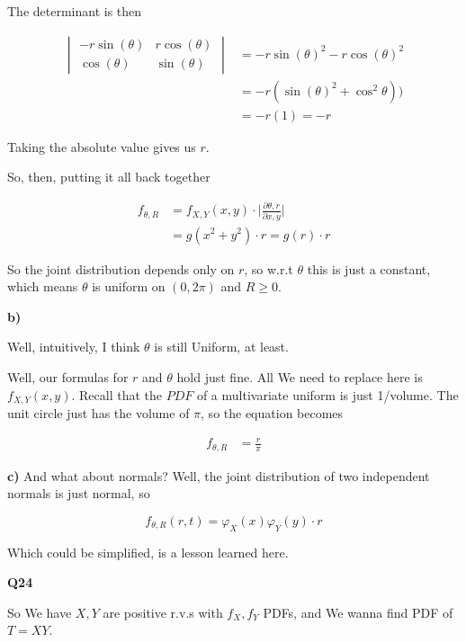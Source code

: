 \documentclass{article}
\begin{document}
			The determinant is then
			
			\begin{align*}
			\begin{vmatrix}
			-r\sin(\theta) & r\cos(\theta) \\
			\cos(\theta) & \sin(\theta)
			\end{vmatrix} &=
			 -r\sin(\theta)^2 - r\cos(\theta)^2\\
			 &= -r(\sin(\theta)^2 + \cos^2\theta))\\
			 &= -r(1) = -r
			\end{align*}
			
			Taking the absolute value gives us $r$.
			
			So, then, putting it all back together
			
			\begin{align*}
			f_{\theta, R} &= f_{X, Y}(x, y)\cdot \bigg|\frac{\partial \theta, r}{\partial x, y} \bigg|\\
			&= g(x^2+y^2) \cdot r = g(r)\cdot r
			\end{align*}
			
			So the joint distribution depends only on $r$, so w.r.t $\theta$ this is just a constant, which means $\theta$ is uniform on $(0, 2\pi)$ and $R\ge 0$.
			
			\textbf{b)}
			
			Well, intuitively, I think $\theta$ is still Uniform, at least.
			
			Well, our formulas for $r$ and $\theta$ hold just fine. All We need to replace here is $f_{X, Y}(x, y)$. Recall that the $PDF$ of a multivariate uniform is just 1/volume. The unit circle just has the volume of $\pi$, so the equation becomes
			
			\begin{align*}
			f_{\theta, R} &= \frac{r}{\pi}
			\end{align*}
			
			\textbf{c)} And what about normals? Well, the joint distribution of two independent normals is just normal, so
			
			\[ f_{\theta, R}(r, t) = \varphi_X(x)\varphi_Y(y)\cdot r \]
			
			Which could be simplified, is a lesson learned here.
			
			\hfill
			
		\textbf{Q24}
			
			So We have $X, Y$ are positive r.v.s with $f_X, f_Y$ PDFs, and We wanna find PDF of $T=XY$.
			
\end{document}
